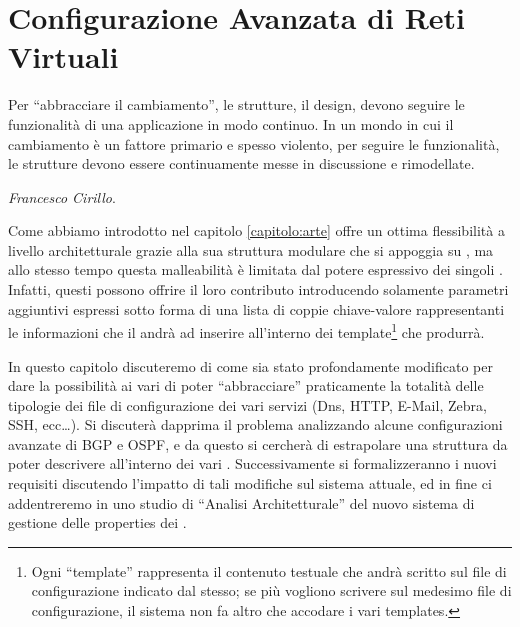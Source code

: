 \chapter{Configurazione Avanzata di Reti Virtuali}\label{capitolo:evoluzione_visualnetkit}

\begin{flushright}
\begin{footnotesize}
Per ``abbracciare il cambiamento'', le strutture, il design, devono seguire le funzionalità di una applicazione in modo continuo. In un mondo in cui il cambiamento è un fattore primario e spesso violento, per seguire le funzionalità, le strutture devono essere continuamente messe in discussione e rimodellate.\\
\end{footnotesize}
\begin{footnotesize}
\textit{Francesco Cirillo}.
\end{footnotesize}
\end{flushright}

Come abbiamo introdotto nel capitolo \ref{capitolo:arte} \visualnetkit{} offre un ottima flessibilità a livello architetturale grazie alla sua struttura modulare che si appoggia su \plugin{}, ma allo stesso tempo questa malleabilità è limitata dal potere espressivo dei singoli \plugin{}. Infatti, questi possono offrire il loro contributo introducendo solamente parametri aggiuntivi espressi sotto forma di una lista di coppie chiave-valore rappresentanti le informazioni che il \plugin{} andrà ad inserire all'interno dei template\footnote{Ogni ``template'' rappresenta il contenuto testuale che andrà scritto sul file di configurazione indicato dal \plugin{} stesso; se più \plugin{} vogliono scrivere sul medesimo file di configurazione, il sistema non fa altro che accodare i vari templates.} che produrrà.

In questo capitolo discuteremo di come \visualnetkit{} sia stato profondamente modificato per dare la possibilità ai vari \plugin{} di poter ``abbracciare'' praticamente la totalità delle tipologie dei file di configurazione dei vari servizi (Dns, HTTP, E-Mail, Zebra, SSH, ecc\ldots). Si discuterà dapprima il problema analizzando alcune configurazioni avanzate di BGP e OSPF, e da questo si cercherà di estrapolare una struttura da poter descrivere all'interno dei vari \plugin{}. Successivamente si formalizzeranno i nuovi requisiti discutendo l'impatto di tali modifiche sul sistema attuale, ed in fine ci addentreremo in uno studio di ``Analisi Architetturale'' del nuovo sistema di gestione delle properties dei \plugin{}.

